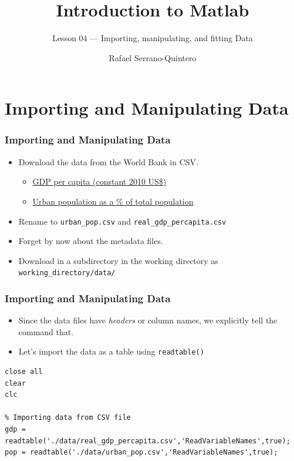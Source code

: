 \documentclass[11pt,xcolor={svgnames},aspectratio=169,usepdftitle=false,notheorems]{beamer}
\title{Introduction to Matlab}
\subtitle{Lesson 04 --- Importing, manipulating, and fitting Data}
\author{Rafael Serrano-Quintero}
\institute{Department of Economics \\ University of Barcelona}
\date{}
\begin{document}
\VerbatimFootnotes

\maketitle

\section{Importing and Manipulating Data}

\begin{frame}[fragile]
    \frametitle{Importing and Manipulating Data}
\begin{itemize}
    \item Download the data from the World Bank in CSV.
    \begin{itemize}
        \item \href{https://data.worldbank.org/indicator/NY.GDP.PCAP.KD}{GDP per capita (constant 2010 US\$)}
        \item \href{https://data.worldbank.org/indicator/SP.URB.TOTL.IN.ZS}{Urban population as a \% of total population}
    \end{itemize}
    \item Rename to \verb;urban_pop.csv; and \verb;real_gdp_percapita.csv;
    \item Forget by now about the metadata files.
    \item Download in a subdirectory in the working directory as \verb;working_directory/data/;
\end{itemize}
\end{frame}

\begin{frame}[fragile]
  \frametitle{Importing and Manipulating Data}
\begin{itemize}
  \item Since the data files have \textit{headers} or column names, we explicitly tell the command that.
  \item Let's import the data as a table using \verb;readtable();
\end{itemize}
\begin{lstlisting}
close all
clear
clc

% Importing data from CSV file
gdp = readtable('./data/real_gdp_percapita.csv','ReadVariableNames',true);
pop = readtable('./data/urban_pop.csv','ReadVariableNames',true);  
\end{lstlisting}
\end{frame}
\end{document}
